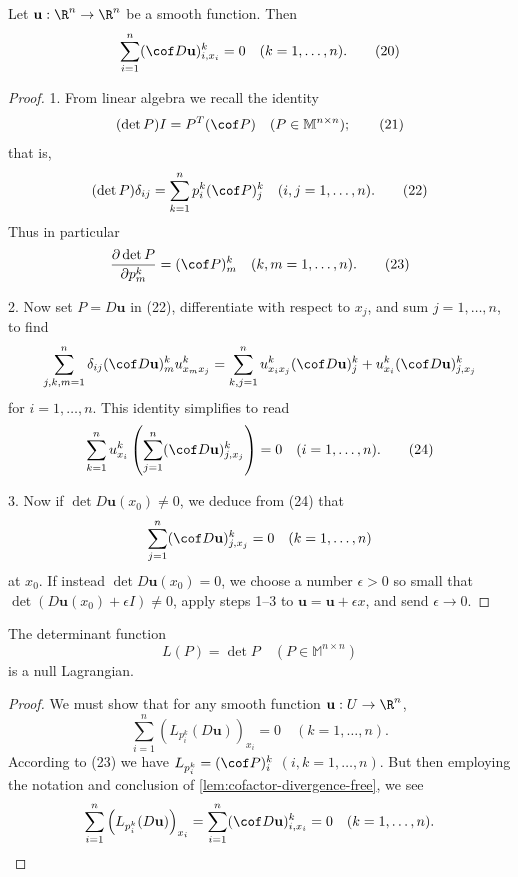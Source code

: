 \begin{lemma}
\label{lem:cofactor-divergence-free}
Let $\mathbf{u} : \R^n \to \R^n$ be a smooth function. Then
\[
\sum_{i=1}^n (\cof D\mathbf{u})^k_{i,x_i} = 0 \quad (k = 1, \ldots, n).
\tag{20}
\]
\end{lemma}
\begin{proof}
1. From linear algebra we recall the identity
\[
(\det P) I = P^T (\cof P) \quad (P \in \mathbb{M}^{n \times n});
\tag{21}
\]
that is,
\[
(\det P) \delta_{ij} = \sum_{k=1}^n p^k_i (\cof P)^k_j \quad (i, j = 1, \ldots, n).
\tag{22}
\]
Thus in particular
\[
\frac{\partial \det P}{\partial p^k_m} = (\cof P)^k_m \quad (k, m = 1, \ldots, n).
\tag{23}
\]

2. Now set $P = D\mathbf{u}$ in (22), differentiate with respect to $x_j$, and sum $j = 1, \ldots, n$, to find
\[
\sum_{j,k,m=1}^n \delta_{ij} (\cof D\mathbf{u})^k_m u^k_{x_m x_j} = \sum_{k,j=1}^n u^k_{x_i x_j} (\cof D\mathbf{u})^k_j + u^k_{x_i} (\cof D\mathbf{u})^k_{j,x_j}
\]
for $i = 1, \ldots, n$. This identity simplifies to read
\[
\sum_{k=1}^n u^k_{x_i} \left(\sum_{j=1}^n (\cof D\mathbf{u})^k_{j,x_j}\right) = 0 \quad (i = 1, \ldots, n).
\tag{24}
\]

3. Now if $\det D\mathbf{u}(x_0) \neq 0$, we deduce from (24) that
\[
\sum_{j=1}^{n}(\cof D\mathbf{u})^k_{j,x_j} = 0 \quad (k = 1, \ldots, n)
\]
at $x_0$. If instead $\det D\mathbf{u}(x_0) = 0$, we choose a number $\epsilon > 0$ so small that $\det(D\mathbf{u}(x_0) + \epsilon I) \neq 0$, apply steps 1--3 to $\mathbf{u} = \mathbf{u} + \epsilon x$, and send $\epsilon \to 0$.
\end{proof}

\begin{theorem}
\label{thm:determinant-null-lagrangian}
The determinant function
\[
L(P) = \det P \quad (P \in \mathbb{M}^{n \times n})
\]
is a null Lagrangian.
\end{theorem}
\begin{proof}
We must show that for any smooth function $\mathbf{u} : U \to \R^n$,
\[
\sum_{i=1}^{n} \left( L_{p^k_i}(D\mathbf{u}) \right)_{x_i} = 0 \quad (k = 1, \ldots, n).
\]
According to (23) we have $L_{p^k_i} = (\cof P)^k_i$ $(i, k = 1, \ldots, n)$. But then employing the notation and conclusion of \cref{lem:cofactor-divergence-free}, we see
\[
\sum_{i=1}^{n} \left( L_{p^k_i}(D\mathbf{u}) \right)_{x_i} = \sum_{i=1}^{n} (\cof D\mathbf{u})^k_{i,x_i} = 0 \quad (k = 1, \ldots, n).
\]
\end{proof}

